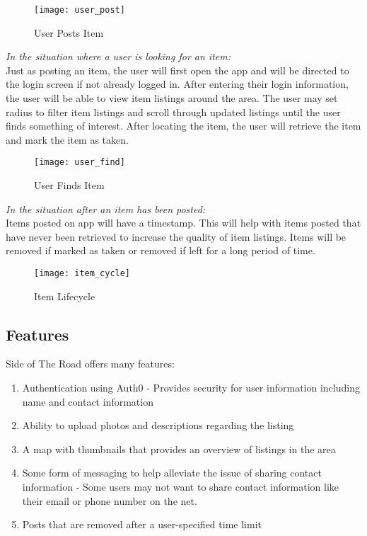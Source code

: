 \documentclass[sigconf]{acmart}
\begin{document}
\begin{figure}[h]
	\texttt{[image: user\_post]}
	\caption{User Posts Item}
	\label{}
\end{figure}

\emph{In the situation where a user is looking for an item:} \\
Just as posting an item, the user will first open the app and will be directed to the login screen if not already logged in. After entering their login information, the user will be able to view item listings around the area. The user may set radius to filter item listings and scroll through updated listings until the user finds something of interest. After locating the item, the user will retrieve the item and mark the item as taken.

\begin{figure}[h]
	\texttt{[image: user\_find]}
	\caption{User Finds Item}
	\label{}
\end{figure}


\emph{In the situation after an item has been posted:}\\
Items posted on app will have a timestamp. This will help with items posted that have never been retrieved to increase the quality of item listings. Items will be removed if marked as taken or removed if left for a long period of time.

\begin{figure}[h]
	\texttt{[image: item\_cycle]}
	\caption{Item Lifecycle}
	\label{}
\end{figure}


\subsection{Features}
Side of The Road offers many features:
\begin{enumerate}
	\item Authentication using Auth0 - Provides security for user information including name and 
	contact information
	\item Ability to upload photos and descriptions regarding the listing
	\item A map with thumbnails that provides an overview of listings in the area
	\item Some form of messaging to help alleviate the issue of sharing contact information - Some 	users may not want to share contact information like their email or phone number on the net.
	\item Posts that are removed after a user-specified time limit
\end{enumerate}
\end{document}

